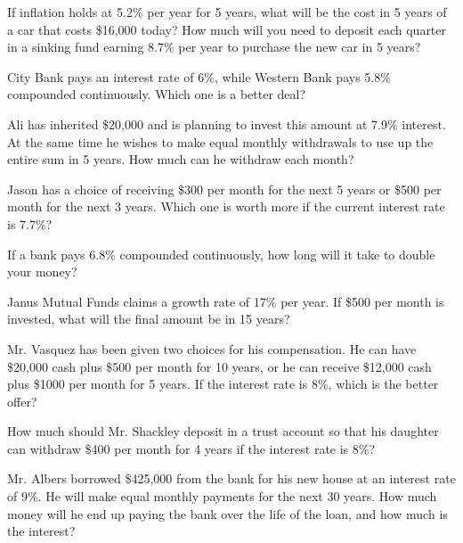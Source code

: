 \begin{puzzle}
    If inflation holds at 5.2\% per year for 5 years, what will be the cost in 5 years of a car that costs \$16,000 today? How much will you need to deposit each quarter in a sinking fund earning 8.7\% per year to purchase the new car in 5 years?
\end{puzzle}

\begin{puzzle}
    City Bank pays an interest rate of 6\%, while Western Bank pays 5.8\% compounded continuously. Which one is a better deal?
\end{puzzle}

\begin{puzzle}
    Ali has inherited \$20,000 and is planning to invest this amount at 7.9\% interest. At the same time he wishes to make equal monthly withdrawals to use up the entire sum in 5 years. How much can he withdraw each month?
\end{puzzle}

\begin{puzzle}
    Jason has a choice of receiving \$300 per month for the next 5 years or \$500 per month for the next 3 years. Which one is worth more if the current interest rate is 7.7\%?
\end{puzzle}

\begin{puzzle}
    If a bank pays 6.8\% compounded continuously, how long will it take to double your money?
\end{puzzle}

\begin{puzzle}
    Janus Mutual Funds claims a growth rate of 17\% per year. If \$500 per month is invested, what will the final amount be in 15 years?
\end{puzzle}

\begin{puzzle}
    Mr. Vasquez has been given two choices for his compensation. He can have \$20,000 cash plus \$500 per month for 10 years, or he can receive \$12,000 cash plus \$1000 per month for 5 years. If the interest rate is 8\%, which is the better offer?
\end{puzzle}

\begin{puzzle}
    How much should Mr. Shackley deposit in a trust account so that his daughter can withdraw \$400 per month for 4 years if the interest rate is 8\%?
\end{puzzle}

\begin{puzzle}
    Mr. Albers borrowed \$425,000 from the bank for his new house at an interest rate of 9\%. He will make equal monthly payments for the next 30 years. How much money will he end up paying the bank over the life of the loan, and how much is the interest?
\end{puzzle}

